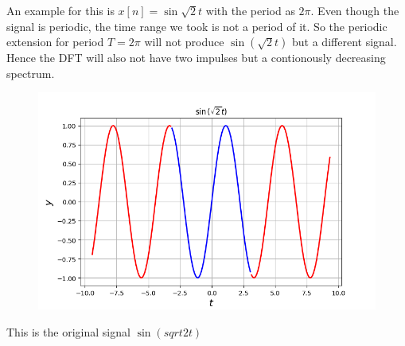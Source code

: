 \documentclass[12pt, a4paper]{article}
\begin{document}
An example for this is $x[n]=\sin{\sqrt{2}t}$ with the period as $2\pi$. Even though the signal is periodic, the time range we took is not a period of it. So the periodic extension for period $T = 2\pi$ will not produce $\sin(\sqrt{2}t)$ but a different signal. Hence the DFT will also not have two impulses but a contionously decreasing spectrum.
\begin{figure}[H]
    \centering
    \includegraphics[scale = 0.8]{Figure_1.png}
    \label{fig:sample}
\end{figure}
\begin{center}
    This is the original signal $\sin(sqrt{2}t)$
\end{center}
\end{document}
